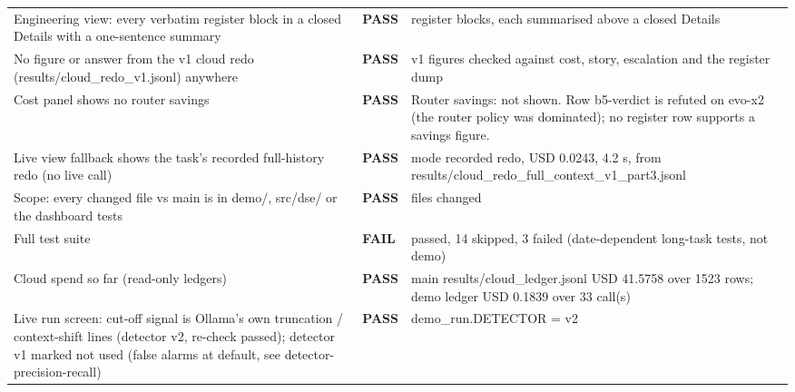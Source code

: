 \begin{longtable}{>{\raggedright\arraybackslash}p{}p{}>{\raggedright\arraybackslash}p{}}
Engineering view: every verbatim register block in a closed Details with a one-sentence summary & \textbf{PASS} & 3 register blocks, each summarised above a closed Details \\

No figure or answer from the v1 cloud redo (results/cloud\_redo\_v1.jsonl) anywhere & \textbf{PASS} & 6 v1 figures checked against cost, story, escalation and the register dump \\

Cost panel shows no router savings & \textbf{PASS} & Router savings: not shown. Row b5-verdict is refuted on evo-x2 (the router policy was dominated); no register row supports a savings figure. \\

Live view fallback shows the task's recorded full-history redo (no live call) & \textbf{PASS} & mode recorded redo, USD 0.0243, 4.2 s, from results/cloud\_redo\_full\_context\_v1\_part3.jsonl \\

Scope: every changed file vs main is in demo/, src/dse/ or the dashboard tests & \textbf{PASS} & 0 files changed \\

Full test suite & \textbf{FAIL} & 2909 passed, 14 skipped, 3 failed (date-dependent long-task tests, not demo) \\

Cloud spend so far (read-only ledgers) & \textbf{PASS} & main results/cloud\_ledger.jsonl USD 41.5758 over 1523 rows; demo ledger USD 0.1839 over 33 call(s) \\

Live run screen: cut-off signal is Ollama's own truncation / context-shift lines (detector v2, re-check passed); detector v1 marked not used (false alarms at default, see detector-precision-recall) & \textbf{PASS} & demo\_run.DETECTOR = v2 \\

\bottomrule
\end{longtable}
